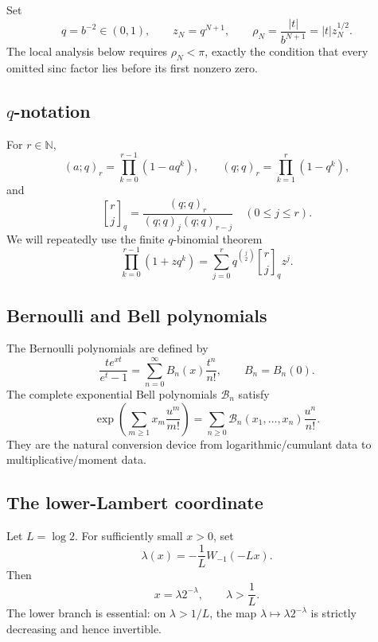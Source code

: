 \documentclass[11pt]{article}
\theoremstyle{definition}
\theoremstyle{remark}
\newcommand{\N}{\mathbb{N}}
\newcommand{\qbinom}[3]{\genfrac{[}{]}{0pt}{}{#1}{#2}_{#3}}
\begin{document}
Set
\begin{equation}
q=b^{-2}\in(0,1),\qquad z_N=q^{N+1},\qquad
\rho_N=\frac{|t|}{b^{N+1}}=|t|z_N^{1/2}.
\label{eq:q-z-rho}
\end{equation}
The local analysis below requires $\rho_N<\pi$, exactly the condition that every omitted sinc factor lies before its first nonzero zero.

\subsection{\texorpdfstring{$q$}{q}-notation}

For $r\in\N$,
\[
(a;q)_r=\prod_{k=0}^{r-1}(1-aq^k),\qquad
(q;q)_r=\prod_{k=1}^{r}(1-q^k),
\]
and
\[
\qbinom{r}{j}{q}=\frac{(q;q)_r}{(q;q)_j(q;q)_{r-j}}
\quad(0\le j\le r).
\]
We will repeatedly use the finite $q$-binomial theorem
\begin{equation}
\prod_{k=0}^{r-1}(1+zq^k)
=\sum_{j=0}^{r}q^{\binom{j}{2}}\qbinom{r}{j}{q} z^j.
\label{eq:q-binomial}
\end{equation}

\subsection{Bernoulli and Bell polynomials}

The Bernoulli polynomials are defined by
\begin{equation}
\frac{te^{xt}}{e^t-1}=\sum_{n=0}^{\infty}B_n(x)\frac{t^n}{n!},
\qquad B_n=B_n(0).
\label{eq:bernoulli-gen}
\end{equation}
The complete exponential Bell polynomials $\mathcal B_n$ satisfy
\begin{equation}
\exp\!\left(\sum_{m\ge1}x_m\frac{u^m}{m!}\right)
=\sum_{n\ge0}\mathcal B_n(x_1,\ldots,x_n)\frac{u^n}{n!}.
\label{eq:bell-gen}
\end{equation}
They are the natural conversion device from logarithmic/cumulant data to multiplicative/moment data.

\subsection{The lower-Lambert coordinate}

Let $L=\log 2$. For sufficiently small $x>0$, set
\begin{equation}
\lambda(x)=-\frac{1}{L}W_{-1}(-Lx).
\label{eq:lambda-def}
\end{equation}
Then
\begin{equation}
x=\lambda 2^{-\lambda},\qquad \lambda>\frac1L.
\label{eq:lambda-inverse}
\end{equation}
The lower branch is essential: on $\lambda>1/L$, the map $\lambda\mapsto\lambda2^{-\lambda}$ is strictly decreasing and hence invertible.
\end{document}
